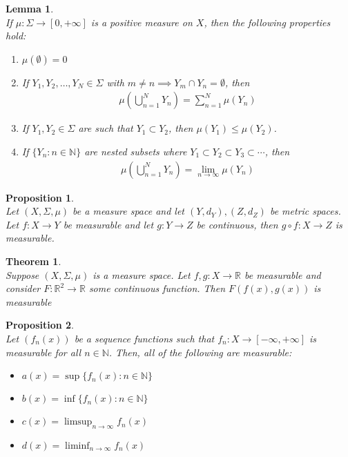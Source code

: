 \documentclass[10pt,a4paper]{article}
\newtheorem{theorem}{Theorem}
\newtheorem{lemma}{Lemma}
\newtheorem{proposition}{Proposition}
\theoremstyle{definition}
\theoremstyle{definition}
\numberwithin{equation}{section}
\numberwithin{theorem}{section}
\numberwithin{proposition}{section}
\numberwithin{lemma}{section}
\numberwithin{corollary}{section}
\begin{document}
\begin{lemma}$ $
\\If $\mu: \Sigma \to [0, +\infty]$ is a positive measure on $X$, then the following properties hold:
\begin{enumerate}
\item $\mu(\emptyset) = 0$
\item If $Y_1, Y_2, \ldots, Y_N \in \Sigma$ with $m \neq n \implies Y_m \cap Y_n = \emptyset$, then 
\begin{align*}
\mu\left(\bigcup_{n = 1}^N Y_n \right) = \sum_{n = 1}^N \mu(Y_n)
\end{align*}
\item If $Y_1, Y_2 \in \Sigma$ are such that $Y_1 \subset Y_2$, then $\mu(Y_1) \leq \mu(Y_2)$.
\item If $\{Y_n : n \in \mathbb{N}\}$ are nested subsets where $Y_1 \subset Y_2 \subset Y_3 \subset \cdots$, then 
\begin{align*}
\mu\left(\bigcup_{n = 1}^N Y_n \right) = \lim_{n \to \infty} \mu(Y_n)
\end{align*}
\end{enumerate}
\end{lemma}

\begin{proposition}$ $
\\Let $(X, \Sigma, \mu)$ be a measure space and let $(Y, d_Y), (Z, d_Z)$ be metric spaces. Let $f: X \to Y$ be measurable and let $g: Y \to Z$ be continuous, then $g \circ f: X \to Z$ is measurable. 
\end{proposition}

\begin{theorem}$ $
\\Suppose $(X, \Sigma, \mu)$ is a measure space. Let $f, g: X \to \mathbb{R}$ be measurable and consider $F: \mathbb{R}^2 \to \mathbb{R}$ some continuous function. Then $F(f(x), g(x))$ is measurable
\end{theorem}

\begin{proposition}$ $
\\Let $(f_n(x))$ be a sequence functions such that $f_n : X \to [-\infty, +\infty]$ is measurable for all $n \in \mathbb{N}$. Then, all of the following are measurable:
\begin{itemize}
\item $a(x) = \sup\{f_n(x) : n \in \mathbb{N}\}$
\item $b(x) = \inf\{f_n(x) : n \in \mathbb{N}\}$
\item $c(x) = \limsup_{n \to \infty} f_n(x)$
\item $d(x) = \liminf_{n \to \infty} f_n(x)$
\end{itemize}
\end{proposition}
\end{document}
